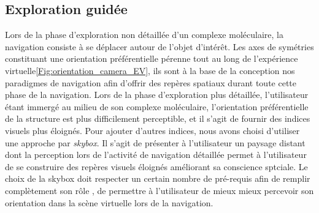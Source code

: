 
\subsection{Exploration guidée}






Lors de la phase d'exploration non détaillée d'un complexe moléculaire, la navigation consiste à se déplacer autour de l'objet d'intérêt. Les axes de symétries constituant une orientation préférentielle pérenne tout au long de l'expérience virtuelle\ref{Fig:orientation_camera_EV}, ils sont à la base de la conception nos paradigmes de navigation afin d'offrir des repères spatiaux durant toute cette phase de la navigation. Lors de la phase d'exploration plus détaillée, l'utilisateur étant immergé au milieu de son complexe moléculaire, l'orientation préférentielle de la structure est plus difficilement perceptible, et il s'agit de fournir des indices visuels plus éloignés. Pour ajouter d'autres indices, nous avons  choisi d'utiliser une approche par \textit{skybox}. Il s'agit de présenter à l'utilisateur un paysage distant  dont la perception lors de l'activité de navigation détaillée permet à l'utilisateur de se construire des repères visuels éloignés améliorant sa conscience sptciale. Le choix de la skybox doit respecter un certain nombre de pré-requis afin de remplir complètement son rôle \cite{vinson_design_1999}, de permettre à l'utilisateur de mieux mieux percevoir son orientation dans la scène virtuelle lors de la navigation. %

